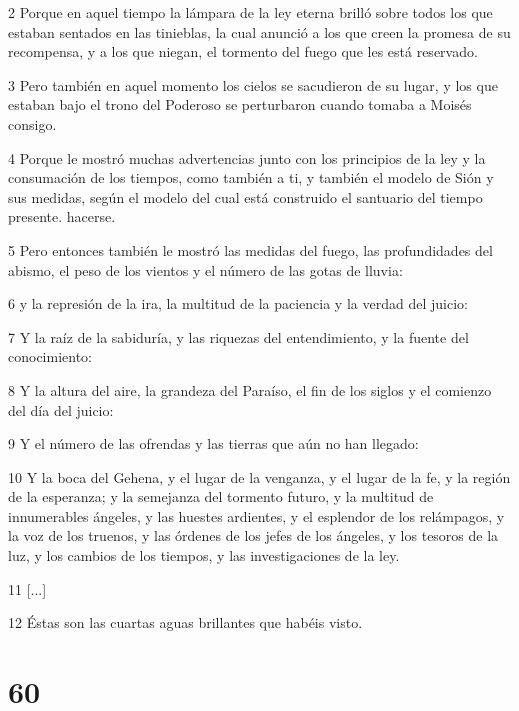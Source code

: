 \par 2 Porque en aquel tiempo la lámpara de la ley eterna brilló sobre todos los que estaban sentados en las tinieblas, la cual anunció a los que creen la promesa de su recompensa, y a los que niegan, el tormento del fuego que les está reservado.

\par 3 Pero también en aquel momento los cielos se sacudieron de su lugar, y los que estaban bajo el trono del Poderoso se perturbaron cuando tomaba a Moisés consigo.

\par 4 Porque le mostró muchas advertencias junto con los principios de la ley y la consumación de los tiempos, como también a ti, y también el modelo de Sión y sus medidas, según el modelo del cual está construido el santuario del tiempo presente. hacerse.

\par 5 Pero entonces también le mostró las medidas del fuego, las profundidades del abismo, el peso de los vientos y el número de las gotas de lluvia:

\par 6 y la represión de la ira, la multitud de la paciencia y la verdad del juicio:

\par 7 Y la raíz de la sabiduría, y las riquezas del entendimiento, y la fuente del conocimiento:

\par 8 Y la altura del aire, la grandeza del Paraíso, el fin de los siglos y el comienzo del día del juicio:

\par 9 Y el número de las ofrendas y las tierras que aún no han llegado:

\par 10 Y la boca del Gehena, y el lugar de la venganza, y el lugar de la fe, y la región de la esperanza; y la semejanza del tormento futuro, y la multitud de innumerables ángeles, y las huestes ardientes, y el esplendor de los relámpagos, y la voz de los truenos, y las órdenes de los jefes de los ángeles, y los tesoros de la luz, y los cambios de los tiempos, y las investigaciones de la ley.

\par 11 [...]

\par 12 Éstas son las cuartas aguas brillantes que habéis visto.

\chapter{60}

